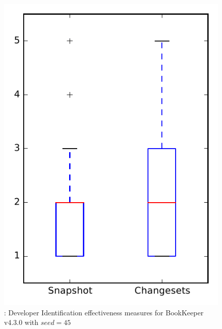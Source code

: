 
\begin{figure}
\centering
\includegraphics[height=0.4\textheight]{figures/dit_seed/rq1_bookkeeper_45}
\caption{\rtwo: Developer Identification effectiveness measures for BookKeeper v4.3.0 with $seed=45$}
\label{fig:dit_seed:rq1:bookkeeper}
\end{figure}
